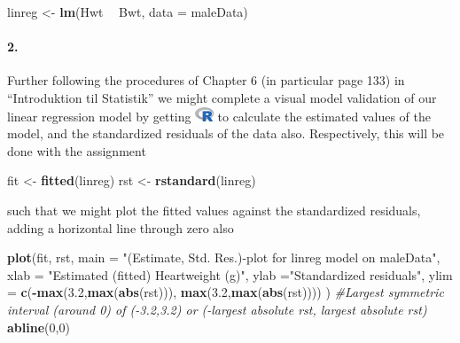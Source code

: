 \documentclass[
]{article}
\newenvironment{Shaded}{\begin{snugshade}}{\end{snugshade}}
\newcommand{\CommentTok}[1]{\textcolor[rgb]{0.56,0.35,0.01}{\textit{#1}}}
\newcommand{\DataTypeTok}[1]{\textcolor[rgb]{0.13,0.29,0.53}{#1}}
\newcommand{\DecValTok}[1]{\textcolor[rgb]{0.00,0.00,0.81}{#1}}
\newcommand{\FloatTok}[1]{\textcolor[rgb]{0.00,0.00,0.81}{#1}}
\newcommand{\KeywordTok}[1]{\textcolor[rgb]{0.13,0.29,0.53}{\textbf{#1}}}
\newcommand{\NormalTok}[1]{#1}
\newcommand{\OperatorTok}[1]{\textcolor[rgb]{0.81,0.36,0.00}{\textbf{#1}}}
\newcommand{\StringTok}[1]{\textcolor[rgb]{0.31,0.60,0.02}{#1}}
\begin{document}
\begin{Shaded}
\begin{Highlighting}[]
\NormalTok{linreg <-}\StringTok{ }\KeywordTok{lm}\NormalTok{(Hwt }\OperatorTok{~}\StringTok{ }\NormalTok{Bwt, }\DataTypeTok{data =}\NormalTok{ maleData)}
\end{Highlighting}
\end{Shaded}

\hypertarget{section-4}{%
\paragraph{\texorpdfstring{\textbf{2.}}{2.}}\label{section-4}}

Further following the procedures of Chapter 6 (in particular page 133)
in ``Introduktion til Statistik'' we might complete a visual model
validation of our linear regression model by getting
\includegraphics[width=\textwidth,height=0.16667in]{R_logo.png} to
calculate the estimated values of the model, and the standardized
residuals of the data also. Respectively, this will be done with the
assignment

\begin{Shaded}
\begin{Highlighting}[]
\NormalTok{fit <-}\StringTok{ }\KeywordTok{fitted}\NormalTok{(linreg)}
\NormalTok{rst <-}\StringTok{ }\KeywordTok{rstandard}\NormalTok{(linreg)}
\end{Highlighting}
\end{Shaded}

such that we might plot the fitted values against the standardized
residuals, adding a horizontal line through zero also

\begin{Shaded}
\begin{Highlighting}[]
\KeywordTok{plot}\NormalTok{(fit, rst, }\DataTypeTok{main =} \StringTok{"(Estimate, Std. Res.)-plot for linreg model on maleData"}\NormalTok{, }\DataTypeTok{xlab =} \StringTok{"Estimated (fitted) Heartweight (g)"}\NormalTok{, }\DataTypeTok{ylab =}\StringTok{"Standardized residuals"}\NormalTok{, }\DataTypeTok{ylim =} \KeywordTok{c}\NormalTok{(}\OperatorTok{-}\KeywordTok{max}\NormalTok{(}\FloatTok{3.2}\NormalTok{,}\KeywordTok{max}\NormalTok{(}\KeywordTok{abs}\NormalTok{(rst))), }\KeywordTok{max}\NormalTok{(}\FloatTok{3.2}\NormalTok{,}\KeywordTok{max}\NormalTok{(}\KeywordTok{abs}\NormalTok{(rst)))) ) }\CommentTok{#Largest symmetric interval (around 0) of (-3.2,3.2) or (-largest absolute rst, largest absolute rst)}
\KeywordTok{abline}\NormalTok{(}\DecValTok{0}\NormalTok{,}\DecValTok{0}\NormalTok{)}
\end{Highlighting}
\end{Shaded}
\end{document}
